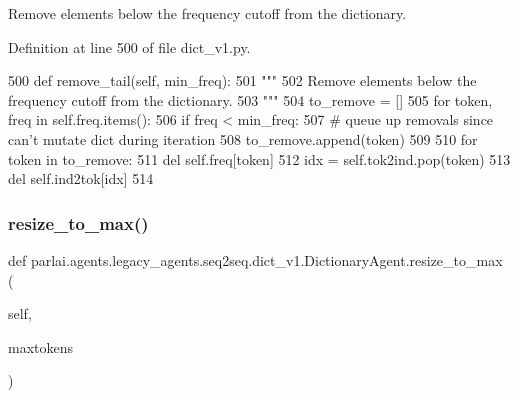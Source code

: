 \begin{DoxyVerb}Remove elements below the frequency cutoff from the dictionary.
\end{DoxyVerb}
 

Definition at line 500 of file dict\+\_\+v1.\+py.


\begin{DoxyCode}
500     \textcolor{keyword}{def }remove\_tail(self, min\_freq):
501         \textcolor{stringliteral}{"""}
502 \textcolor{stringliteral}{        Remove elements below the frequency cutoff from the dictionary.}
503 \textcolor{stringliteral}{        """}
504         to\_remove = []
505         \textcolor{keywordflow}{for} token, freq \textcolor{keywordflow}{in} self.freq.items():
506             \textcolor{keywordflow}{if} freq < min\_freq:
507                 \textcolor{comment}{# queue up removals since can't mutate dict during iteration}
508                 to\_remove.append(token)
509 
510         \textcolor{keywordflow}{for} token \textcolor{keywordflow}{in} to\_remove:
511             del self.freq[token]
512             idx = self.tok2ind.pop(token)
513             del self.ind2tok[idx]
514 
\end{DoxyCode}
\mbox{\label{classparlai_1_1agents_1_1legacy__agents_1_1seq2seq_1_1dict__v1_1_1DictionaryAgent_a11701fcf8e4fb57e78fa6a2f4cc29800}} 
\subsubsection{\texorpdfstring{resize\+\_\+to\+\_\+max()}{resize\_to\_max()}}
{\footnotesize\ttfamily def parlai.\+agents.\+legacy\+\_\+agents.\+seq2seq.\+dict\+\_\+v1.\+Dictionary\+Agent.\+resize\+\_\+to\+\_\+max (\begin{DoxyParamCaption}\item[{}]{self,  }\item[{}]{maxtokens }\end{DoxyParamCaption})}

